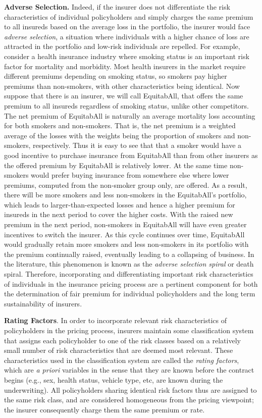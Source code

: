 \documentclass[]{book}
\theoremstyle{definition}
\theoremstyle{definition}
\theoremstyle{definition}
\theoremstyle{remark}
\begin{document}
\textbf{Adverse Selection.} Indeed, if the insurer does not
differentiate the risk characteristics of individual policyholders and
simply charges the same premium to all insureds based on the average
loss in the portfolio, the insurer would face \emph{adverse selection},
a situation where individuals with a higher chance of loss are attracted
in the portfolio and low-risk individuals are repelled. For example,
consider a health insurance industry where smoking status is an
important risk factor for mortality and morbidity. Most health insurers
in the market require different premiums depending on smoking status, so
smokers pay higher premiums than non-smokers, with other characteristics
being identical. Now suppose that there is an insurer, we will call
EquitabAll, that offers the same premium to all insureds regardless of
smoking status, unlike other competitors. The net premium of EquitabAll
is naturally an average mortality loss accounting for both smokers and
non-smokers. That is, the net premium is a weighted average of the
losses with the weights being the proportion of smokers and non-smokers,
respectively. Thus it is easy to see that that a smoker would have a
good incentive to purchase insurance from EquitabAll than from other
insurers as the offered premium by EquitabAll is relatively lower. At
the same time non-smokers would prefer buying insurance from somewhere
else where lower premiums, computed from the non-smoker group only, are
offered. As a result, there will be more smokers and less non-smokers in
the EquitabAll's portfolio, which leads to larger-than-expected losses
and hence a higher premium for insureds in the next period to cover the
higher costs. With the raised new premium in the next period,
non-smokers in EquitabAll will have even greater incentives to switch
the insurer. As this cycle continues over time, EquitabAll would
gradually retain more smokers and less non-smokers in its portfolio with
the premium continually raised, eventually leading to a collapsing of
business. In the literature, this phenomenon is known as the
\emph{adverse selection spiral} or death spiral. Therefore,
incorporating and differentiating important risk characteristics of
individuals in the insurance pricing process are a pertinent component
for both the determination of fair premium for individual policyholders
and the long term sustainability of insurers.

\textbf{Rating Factors}. In order to incorporate relevant risk
characteristics of policyholders in the pricing process, insurers
maintain some classification system that assigns each policyholder to
one of the risk classes based on a relatively small number of risk
characteristics that are deemed most relevant. These characteristics
used in the classification system are called the \emph{rating factors},
which are \emph{a priori} variables in the sense that they are known
before the contract begins (e.g., sex, health status, vehicle type, etc,
are known during the underwriting). All policyholders sharing identical
risk factors thus are assigned to the same risk class, and are
considered homogeneous from the pricing viewpoint; the insurer
consequently charge them the same premium or rate.
\end{document}
